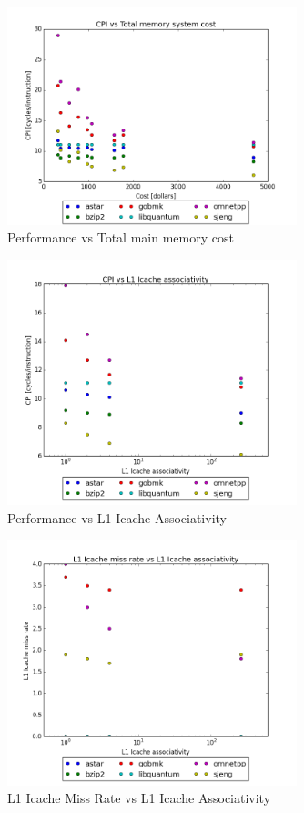 \documentclass{article}
\begin{document}
\begin{figure}[ht]
    \centering
    \includegraphics[width=0.75\textwidth]{plots/CPI_vs_Total_memory_system_cost.png}
    \caption{Performance vs Total main memory cost}
    \label{fig:cpivstotalcost}
\end{figure}

\begin{figure}[ht]
    \centering
    \includegraphics[width=0.75\textwidth]{plots/CPI_vs_L1icache_assoc.png}
    \caption{Performance vs L1 Icache Associativity}
    \label{fig:cpivsl1iassoc}
\end{figure}

\begin{figure}[ht]
    \centering
    \includegraphics[width=0.75\textwidth]{plots/L1icache_miss_vs_L1icache_Assoc.png}
    \caption{L1 Icache Miss Rate vs L1 Icache Associativity}
    \label{fig:L1imissvsl1iassoc}
\end{figure}
\end{document}
